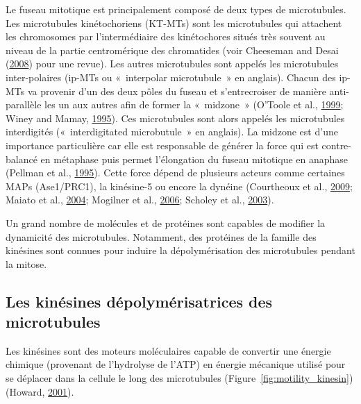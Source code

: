 \documentclass[12pt,a4paper,twoside,openright]{book}
\begin{document}
Le fuseau mitotique est principalement composé de deux types de
microtubules. Les microtubules kinétochoriens (KT-MTs) sont les
microtubules qui attachent les chromosomes par l'intermédiaire des
kinétochores situés très souvent au niveau de la partie centromérique
des chromatides (voir Cheeseman and Desai
(\protect\hyperlink{ref-Cheeseman2008}{2008}) pour une revue). Les
autres microtubules sont appelés les microtubules inter-polaires (ip-MTs
ou «~interpolar microtubule~» en anglais). Chacun des ip-MTs va provenir
d'un des deux pôles du fuseau et s'entrecroiser de manière
anti-parallèle les un aux autres afin de former la «~midzone~» (O'Toole
et al., \protect\hyperlink{ref-OToole1999}{1999}; Winey and Mamay,
\protect\hyperlink{ref-Winey1995}{1995}). Ces microtubules sont alors
appelés les microtubules interdigités («~interdigitated microbutule~» en
anglais). La midzone est d'une importance particulière car elle est
responsable de générer la force qui est contre-balancé en métaphase puis
permet l'élongation du fuseau mitotique en anaphase (Pellman et al.,
\protect\hyperlink{ref-Pellman1995}{1995}). Cette force dépend de
plusieurs acteurs comme certaines MAPs (Ase1/PRC1), la kinésine-5 ou
encore la dynéine (Courtheoux et al.,
\protect\hyperlink{ref-Courtheoux2009}{2009}; Maiato et al.,
\protect\hyperlink{ref-Maiato2004}{2004}; Mogilner et al.,
\protect\hyperlink{ref-Mogilner2006a}{2006}; Scholey et al.,
\protect\hyperlink{ref-Scholey2003}{2003}).

Un grand nombre de molécules et de protéines sont capables de modifier
la dynamicité des microtubules. Notamment, des protéines de la famille
des kinésines sont connues pour induire la dépolymérisation des
microtubules pendant la mitose.

\subsection{Les kinésines dépolymérisatrices des
microtubules}\label{les-kinuxe9sines-duxe9polymuxe9risatrices-des-microtubules}

Les kinésines sont des moteurs moléculaires capable de convertir une
énergie chimique (provenant de l'hydrolyse de l'ATP) en énergie
mécanique utilisé pour se déplacer dans la cellule le long des
microtubules (Figure~\ref{fig:motility_kinesin}) (Howard,
\protect\hyperlink{ref-Howard2001}{2001}).
\end{document}
